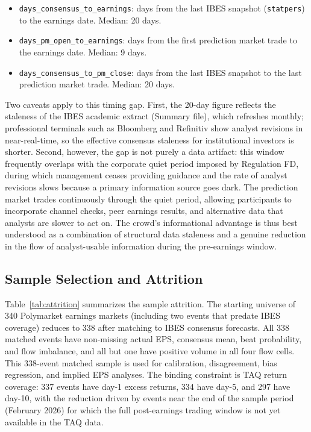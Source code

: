 \documentclass[11pt]{article}
\begin{document}
\begin{itemize}
\item \texttt{days\_consensus\_to\_earnings}: days from the last IBES snapshot (\texttt{statpers}) to the earnings date. Median: 20 days.
\item \texttt{days\_pm\_open\_to\_earnings}: days from the first prediction market trade to the earnings date. Median: 9 days.
\item \texttt{days\_consensus\_to\_pm\_close}: days from the last IBES snapshot to the last prediction market trade. Median: 20 days.
\end{itemize}

Two caveats apply to this timing gap. First, the 20-day figure reflects the staleness of the IBES academic extract (Summary file), which refreshes monthly; professional terminals such as Bloomberg and Refinitiv show analyst revisions in near-real-time, so the effective consensus staleness for institutional investors is shorter. Second, however, the gap is not purely a data artifact: this window frequently overlaps with the corporate quiet period imposed by Regulation FD, during which management ceases providing guidance and the rate of analyst revisions slows because a primary information source goes dark. The prediction market trades continuously through the quiet period, allowing participants to incorporate channel checks, peer earnings results, and alternative data that analysts are slower to act on. The crowd's informational advantage is thus best understood as a combination of structural data staleness and a genuine reduction in the flow of analyst-usable information during the pre-earnings window.

\subsection{Sample Selection and Attrition} \label{sec:attrition}

Table~\ref{tab:attrition} summarizes the sample attrition. The starting universe of 340 Polymarket earnings markets (including two events that predate IBES coverage) reduces to 338 after matching to IBES consensus forecasts. All 338 matched events have non-missing actual EPS, consensus mean, beat probability, and flow imbalance, and all but one have positive volume in all four flow cells. This 338-event matched sample is used for calibration, disagreement, bias regression, and implied EPS analyses. The binding constraint is TAQ return coverage: 337 events have day-1 excess returns, 334 have day-5, and 297 have day-10, with the reduction driven by events near the end of the sample period (February 2026) for which the full post-earnings trading window is not yet available in the TAQ data.
\end{document}
